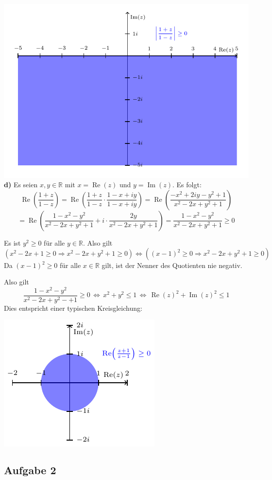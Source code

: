 \documentclass[a4paper,graphics,11pt]{article}
\newcommand{\aufgabe}[1]{\subsection*{Aufgabe #1}}
\newcommand{\re}{\operatorname{Re}}
\newcommand{\im}{\operatorname{Im}}
\begin{document}
\newpage
\qquad\qquad\qquad\includegraphics{graphics/graph5.pdf}\\
\textbf{d)}
Es seien $x,y \in \mathbb{R}$ mit $x=\re(z)$ und $y=\im(z)$. Es folgt:
$$
    \re\left(\frac{1+z}{1-z}\right)
    = \re\left(\frac{1+z}{1-z} \cdot \frac{1-x+iy}{1-x+iy}\right)
    = \re\left(\frac{-x^2+2iy-y^2+1}{x^2-2x+y^2+1}\right)
$$$$
    = \re\left(\frac{1-x^2-y^2}{x^2-2x+y^2+1} + i\cdot \frac{2y}{x^2-2x+y^2+1}\right)
    = \frac{1-x^2-y^2}{x^2-2x+y^2+1} \geq 0
$$

Es ist $y^2 \geq 0$ für alle $y \in \mathbb{R}$. Also gilt
$$
    \left( x^2-2x+1 \geq 0 \Longrightarrow x^2-2x+y^2+1 \geq 0 \right)
    \Longleftrightarrow
    \left( \left( x-1 \right)^2 \geq 0 \Longrightarrow x^2-2x+y^2+1 \geq 0 \right)
$$
Da $\left( x-1 \right)^2 \geq 0$ für alle $x \in \mathbb{R}$ gilt, ist der Nenner des Quotienten nie negativ.

Also gilt
$$
    \frac{1-x^2-y^2}{x^2-2x+y^2-+1} \geq 0
    \,\Longleftrightarrow\, x^2+y^2 \leq 1
    \,\Longleftrightarrow\, \re(z)^2+\im(z)^2 \leq 1
$$
Dies entspricht einer typischen Kreisgleichung:\\
\strut\qquad\qquad\qquad\qquad\qquad\qquad\includegraphics[scale=1.5]{graphics/graph0.pdf}
\newpage
\aufgabe{2}
\end{document}
